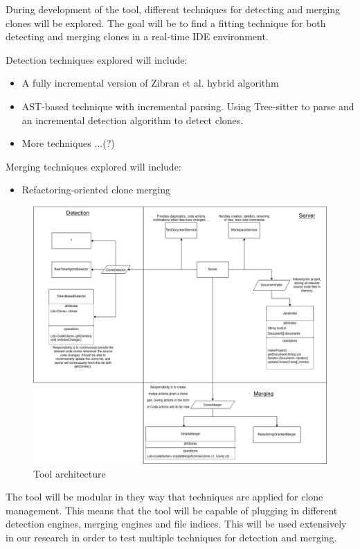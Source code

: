 \documentclass[12pt]{article}
\begin{document}
During development of the tool, different techniques for detecting and merging clones will
be explored. The goal will be to find a fitting technique for both detecting and merging
clones in a real-time IDE environment.

Detection techniques explored will include:

\begin{itemize}
	\item A fully incremental version of Zibran et al. hybrid
	      algorithm\cite{Zibran_real_time_search}
	\item AST-based technique with incremental parsing. Using Tree-sitter to parse and an
        incremental detection algorithm to detect clones.
	\item More techniques ...(?)
\end{itemize}

Merging techniques explored will include:

\begin{itemize}
	\item Refactoring-oriented clone merging\cite{RefactoringOrientedClonesAndMerging}
\end{itemize}

\begin{figure}
	\includegraphics[width=\textwidth]{images/ToolArchitecture.png}
	\caption{Tool architecture}
	\label{fig:architecture}
\end{figure}

The tool will be modular in they way that techniques are applied for clone management. This
means that the tool will be capable of plugging in different detection engines, merging
engines and file indices. This will be used extensively in our research in order to test
multiple techniques for detection and merging.
\end{document}
